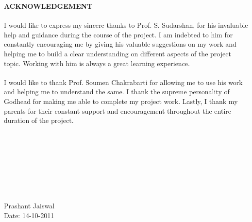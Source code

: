\documentclass[11pt]{report}
\begin{document}
\def\title{Entity Relationship Queries on Web Data}
\def\what{M. Tech. Project Stage I Report}
\def\degree{Master~of~Technology}
\def\who{Prashant S. Jaiswal}
\def\roll{10305014}
\def\guide{Prof. S. Sudarshan}

\titlpage
\def\bsq{\begin{flushright} $\blacksquare$\\ \end{flushright}}
\def\tab{\hspace{5mm}}
\newpage

\begin{center}
\textbf{ACKNOWLEDGEMENT}\\
\end{center}

\paragraph*{}
I would like to express my sincere thanks to Prof. S. Sudarshan, for his invaluable help and guidance during the course of the project. 
I am indebted to him for constantly encouraging me by giving his valuable suggestions on my work and helping me to build a clear understanding 
on different aspects of the project topic. Working with him is always a great learning experience.
\paragraph*{}
I would like to thank Prof. Soumen Chakrabarti for allowing me to use his work and helping me to understand the same.
I thank the supreme personality of Godhead for making me able to complete my project work. Lastly, I thank my parents for 
their constant support and encouragement throughout the entire duration of the project.
\\\\\\\\\\\\\\\\\\
Prashant Jaiswal\\
Date: 14-10-2011
\end{document}
